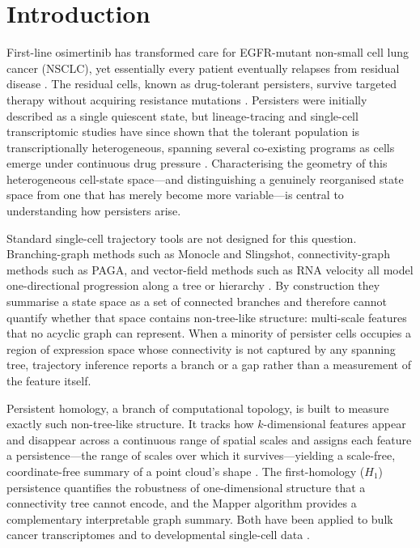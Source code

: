 \section{Introduction}

First-line osimertinib has transformed care for EGFR-mutant
non-small cell lung cancer (NSCLC), yet essentially every patient
eventually relapses from residual disease
\citep{ramalingam2020,piotrowska2018}. The residual cells, known as
drug-tolerant persisters, survive targeted therapy without acquiring
resistance mutations \citep{sharma2010,hata2016}. Persisters were
initially described as a single quiescent state, but lineage-tracing
and single-cell transcriptomic studies have since shown that the
tolerant population is transcriptionally heterogeneous, spanning
several co-existing programs as cells emerge under continuous drug
pressure \citep{oren2021,aissa2021,shaffer2017}. Characterising the
geometry of this heterogeneous cell-state space---and distinguishing
a genuinely reorganised state space from one that has merely become
more variable---is central to understanding how persisters arise.

Standard single-cell trajectory tools are not designed for this
question. Branching-graph methods such as Monocle and Slingshot,
connectivity-graph methods such as PAGA, and vector-field methods
such as RNA velocity all model one-directional progression along a
tree or hierarchy \citep{saelens2019,wolf2018}. By construction they
summarise a state space as a set of connected branches and therefore
cannot quantify whether that space contains non-tree-like structure:
multi-scale features that no acyclic graph can represent. When a
minority of persister cells occupies a region of expression space
whose connectivity is not captured by any spanning tree, trajectory
inference reports a branch or a gap rather than a measurement of the
feature itself.

Persistent homology, a branch of computational topology, is built to
measure exactly such non-tree-like structure. It tracks how
$k$-dimensional features appear and disappear across a continuous
range of spatial scales and assigns each feature a persistence---the
range of scales over which it survives---yielding a scale-free,
coordinate-free summary of a point cloud's shape
\citep{edelsbrunner2010,cohen-steiner2007}. The first-homology
($H_1$) persistence quantifies the robustness of one-dimensional
structure that a connectivity tree cannot encode, and the Mapper
algorithm \citep{singh2007} provides a complementary interpretable
graph summary. Both have been applied to bulk cancer transcriptomes
\citep{nicolau2011} and to developmental single-cell data
\citep{rizvi2017}.

